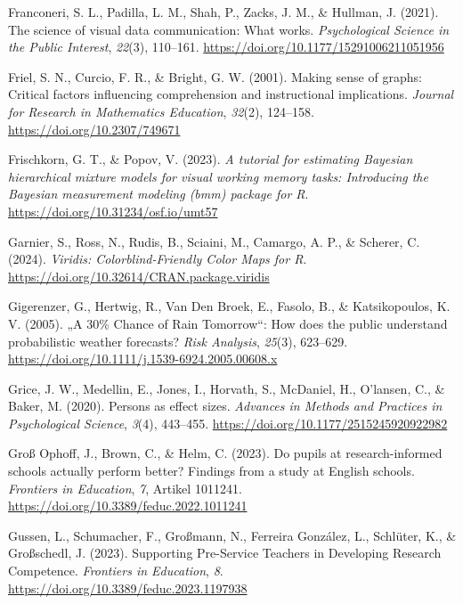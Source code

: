 \documentclass[
  jou,
  floatsintext,
  longtable,
  nolmodern,
  notxfonts,
  notimes,
  colorlinks=true,linkcolor=blue,citecolor=blue,urlcolor=blue]{apa7}
\newlength{\cslhangindent}
\newenvironment{CSLReferences}[2] %
 {\begin{list}{}{%
  \setlength{\itemindent}{0pt}
  \setlength{\leftmargin}{0pt}
  \setlength{\parsep}{0pt}
  \ifodd #1
   \setlength{\leftmargin}{\cslhangindent}
   \setlength{\itemindent}{-1\cslhangindent}
  \fi
  \setlength{\itemsep}{#2\baselineskip}}}
 {\end{list}}
\begin{document}
\begin{CSLReferences}{1}{0}
Franconeri, S. L., Padilla, L. M., Shah, P., Zacks, J. M., \& Hullman,
J. (2021). The science of visual data communication: What works.
\emph{Psychological Science in the Public Interest}, \emph{22}(3),
110--161. \url{https://doi.org/10.1177/15291006211051956}

Friel, S. N., Curcio, F. R., \& Bright, G. W. (2001). Making sense of
graphs: Critical factors influencing comprehension and instructional
implications. \emph{Journal for Research in Mathematics Education},
\emph{32}(2), 124--158. \url{https://doi.org/10.2307/749671}

Frischkorn, G. T., \& Popov, V. (2023). \emph{A tutorial for estimating
{Bayesian} hierarchical mixture models for visual working memory tasks:
{Introducing} the {Bayesian} measurement modeling (bmm) package for
{R}}. \url{https://doi.org/10.31234/osf.io/umt57}

Garnier, S., Ross, N., Rudis, B., Sciaini, M., Camargo, A. P., \&
Scherer, C. (2024). \emph{Viridis: {Colorblind-Friendly Color Maps} for
{R}}. \url{https://doi.org/10.32614/CRAN.package.viridis}

Gigerenzer, G., Hertwig, R., Van Den Broek, E., Fasolo, B., \&
Katsikopoulos, K. V. (2005). {„A {30\%} Chance of Rain Tomorrow``}: How
does the public understand probabilistic weather forecasts? \emph{Risk
Analysis}, \emph{25}(3), 623--629.
\url{https://doi.org/10.1111/j.1539-6924.2005.00608.x}

Grice, J. W., Medellin, E., Jones, I., Horvath, S., McDaniel, H.,
O'lansen, C., \& Baker, M. (2020). Persons as effect sizes.
\emph{Advances in Methods and Practices in Psychological Science},
\emph{3}(4), 443--455. \url{https://doi.org/10.1177/2515245920922982}

Groß Ophoff, J., Brown, C., \& Helm, C. (2023). Do pupils at
research-informed schools actually perform better? Findings from a study
at English schools. \emph{Frontiers in Education}, \emph{7}, Artikel
1011241. \url{https://doi.org/10.3389/feduc.2022.1011241}

Gussen, L., Schumacher, F., Großmann, N., Ferreira González, L.,
Schlüter, K., \& Großschedl, J. (2023). Supporting Pre-Service Teachers
in Developing Research Competence. \emph{Frontiers in Education},
\emph{8}. \url{https://doi.org/10.3389/feduc.2023.1197938}


\end{CSLReferences}
\end{document}

